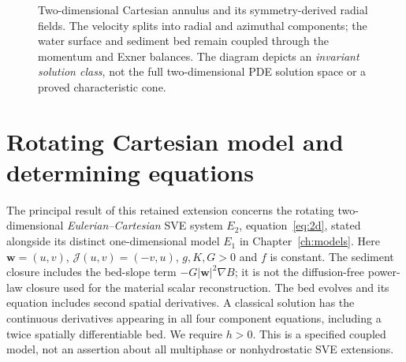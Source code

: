 \documentclass[12pt,a4paper,oneside]{report}
\numberwithin{equation}{chapter}
\theoremstyle{remark}\newtheorem{remark}[theorem]{Remark}
\begin{document}
\begin{figure}[htbp]\centering
{}
\caption[Cartesian annulus and radial quotient]{Two-dimensional Cartesian annulus and its symmetry-derived radial
fields. The velocity splits into radial and azimuthal components; the water
surface and sediment bed remain coupled through the momentum and Exner
balances. The diagram depicts an \emph{invariant solution class}, not the
full two-dimensional PDE solution space or a proved characteristic cone.}
\label{fig:annular-schema}
\end{figure}


\section{Rotating Cartesian model and determining equations}
The principal result of this retained extension concerns the rotating two-dimensional
\emph{Eulerian--Cartesian} SVE system $E_2$, equation~\eqref{eq:2d},
stated alongside its distinct one-dimensional model $E_1$
in Chapter~\ref{ch:models}. Here
$\mathbf w=(u,v)$, $\mathcal J(u,v)=(-v,u)$,
$g,K,G>0$ and $f$ is constant. The sediment closure includes the bed-slope
term $-G|\mathbf w|^2\nabla B$; it is not the diffusion-free
power-law closure used for the material scalar reconstruction.
The bed evolves and its equation includes second spatial derivatives.
A classical solution has the continuous derivatives appearing in all four
component equations, including a twice spatially differentiable bed. We
require $h>0$. This is a specified coupled model, not an assertion about all
multiphase or nonhydrostatic SVE extensions.
\end{document}
